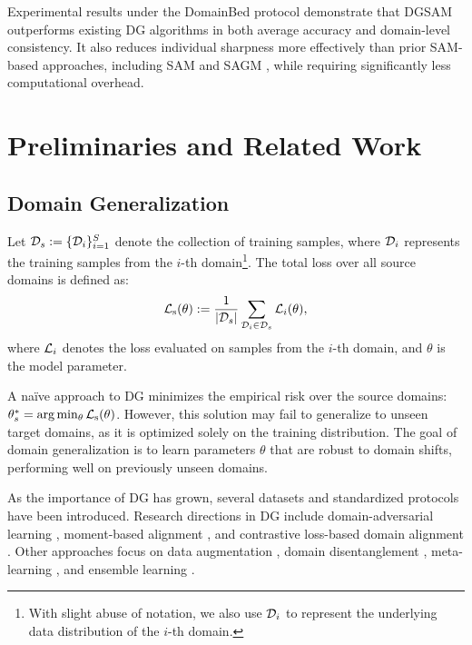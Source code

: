 \documentclass{article}
\theoremstyle{plain}
\theoremstyle{definition}
\theoremstyle{remark}
\begin{document}
Experimental results under the DomainBed protocol \citep{gulrajani2021domainbed} demonstrate that DGSAM outperforms existing DG algorithms in both average accuracy and domain-level consistency. It also reduces individual sharpness more effectively than prior SAM-based approaches, including SAM and SAGM \citep{wang2023sagm}, while requiring significantly less computational overhead.

\section{Preliminaries and Related Work}
\subsection{Domain Generalization}

Let \( {\mathcal{D}}_s := \{{\mathcal{D}}_i\}^{S}_{i=1} \) denote the collection of training samples, where \( {\mathcal{D}}_{i} \) represents the training samples from the $i$-th domain\footnote{With slight abuse of notation, we also use ${\mathcal{D}}_i$ to represent the underlying data distribution of the $i$-th domain.}. The total loss over all source domains is defined as:
\begin{equation}
     {\mathcal{L}}_{\text{s}}(\theta) := \frac{1}{|{\mathcal{D}}_s|} \sum_{{\mathcal{D}}_i \in {\mathcal{D}}_s} {\mathcal{L}}_{i}(\theta),
\end{equation}\label{eq:loss_source}
where ${\mathcal{L}}_{i}$ denotes the loss evaluated on samples from the $i$-th domain, and $\theta$ is the model parameter. 

A na\"ive approach to DG minimizes the empirical risk over the source domains: \( \theta^*_s = \arg \min_{\theta} {\mathcal{L}}_{\text{s}}(\theta) \). However, this solution may fail to generalize to unseen target domains, as it is optimized solely on the training distribution. The goal of domain generalization is to learn parameters \( \theta \) that are robust to domain shifts, performing well on previously unseen domains.

As the importance of DG has grown, several datasets \citep{li2017pacs, fang2013VLCS, peng2019domainnet} and standardized protocols \citep{gulrajani2021domainbed, koh2021wilds} have been introduced. Research directions in DG include domain-adversarial learning \citep{jia2020adver3, li2018adver1, akuzawa2020adver4, shao2019adver2, zhao2020adver5}, moment-based alignment \citep{ghifary2016moment2, muandet2013moment1, li2018moment3}, and contrastive loss-based domain alignment \citep{yoon2019contra2, motiian2017contra1}. Other approaches focus on data augmentation \citep{xu2020dataaug3, shi2020dataaug1, qiao2020dataaug2}, domain disentanglement \citep{li2017distang1, khosla2012distang2}, meta-learning \citep{li2018mldg, zhang2021arm, li2019meta1}, and ensemble learning \citep{cha2021swad, seo2020ensemble2, xu2014ensemble1}.
\end{document}
